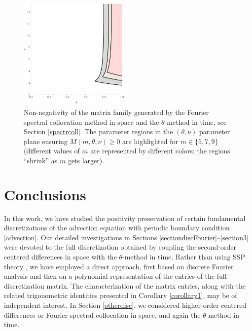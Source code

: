 \documentclass[a4paper]{article}
\newcommand{\te}{\theta}
\begin{document}
\begin{figure}
\begin{center}
\includegraphics[width=0.48\textwidth]{fig_spectral.pdf}
\caption{Non-negativity of the matrix family generated by the Fourier spectral collocation method in space and the $\theta$-method in time, see Section \ref{spectrcoll}. The parameter regions in the $(\te,\nu)$ parameter plane ensuring $M(m,\te,\nu)\ge 0$ are highlighted for $m\in\{5, 7, 9\}$ (different values of $m$ are represented by different colors; the regions ``shrink'' as $m$ gets larger).}\label{fig_spectral}
\end{center}
\end{figure}


\section{Conclusions}\label{conclusions}

In this work, we have studied the positivity preservation of certain fundamental
discretizations of the advection equation with periodic boundary condition \eqref{advection}. 
Our detailed investigations in Sections \ref{sectiondiscFourier}--\ref{section3}
were devoted to the  full discretization obtained by coupling the second-order centered
differences in space with the $\theta$-method in time.  
 Rather than using SSP theory \cite{SSPbook}, 
we have employed a direct
approach, first based on discrete Fourier analysis and then
on a polynomial representation of the entries of the full discretization matrix.
The characterization of the %
matrix entries, %
along with the related trigonometric identities
presented in Corollary \ref{corollary1}, may be of independent interest.
In Section \ref{otherdisc}, we considered higher-order centered
differences or Fourier spectral collocation in space, and again the $\theta$-method in time. 
\end{document}
